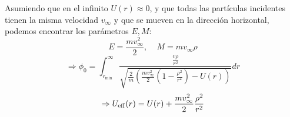 \documentclass[]{article}
\numberwithin{equation}{section}
\begin{document}
Asumiendo que en el infinito \(U(r)\approx 0\), y que todas las partículas incidentes tienen la misma velocidad \(v_\infty\) y que se mueven en la dirección horizontal, podemos encontrar los parámetros \(E, M\):
\begin{equation}
	E = \frac{m v_\infty^2}{2}, ~~~~~M = m v_\infty \rho
\end{equation}
\begin{equation}
	\Rightarrow \phi_0 = \int_{r_\mathrm{min}}^{\infty} \frac{\frac{v \rho}{r^2}}{\sqrt{\frac{2}{m} \left(\frac{m v_\infty^2}{2}\left(1 - \frac{\rho^2}{r^2}\right) - U(r)\right)}} dr \label{phi0_int_dr}
\end{equation}
\begin{equation}
	\Rightarrow U_\mathrm{eff}(r) = U(r) + \frac{m v_\infty^2}{2}\frac{\rho^2}{r^2}
\end{equation}
\end{document}
